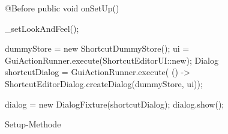 \begin{wrapfigure}[9]{r}[0px]{322px}
    \centering
	\vspace{-12px}
	\begin{spacing}{0.75}
		\begin{javacode}[firstnumber=28]
@Before
public void onSetUp()
{
  _setLookAndFeel();
  
  dummyStore = new ShortcutDummyStore();
  ui = GuiActionRunner.execute(ShortcutEditorUI::new);
  Dialog shortcutDialog = GuiActionRunner.execute(
      () -> ShortcutEditorDialog.createDialog(dummyStore, ui));
  
  dialog = new DialogFixture(shortcutDialog);
  dialog.show();
}\end{javacode}
	\end{spacing}
	\caption{Setup-Methode}
	\label{fig:Test-ShortcutEditor-onSetUp}
\end{wrapfigure}
